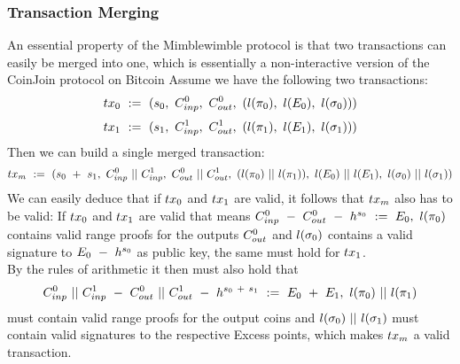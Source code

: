 \subsubsection{Transaction Merging}
An essential property of the Mimblewimble protocol is that two transactions can easily be merged into one, which is essentially a non-interactive version of the CoinJoin protocol on Bitcoin \cite{maxwell2013coinjoin}
Assume we have the following two transactions:
\[ tx_0 ~:=~ (s_0 ,~ C_{inp}^0 ,~ C_{out}^0 ,~ (l(\pi_0) ,~ l(E_0) ,~ l(\sigma_0)) ) \]
\[ tx_1 ~:=~ (s_1 ,~ C_{inp}^1 ,~ C_{out}^1 ,~ (l(\pi_1) ,~ l(E_1) ,~ l(\sigma_1)) ) \]
Then we can build a single merged transaction:
\[ tx_m ~:=~ (s_0 ~+~ s_1 ,~ C_{inp}^0 ~||~ C_{inp}^1,~C_{out}^0 ~||~ C_{out}^1 ,~ (l(\pi_0) ~||~ l(\pi_1)) ,~
l(E_0) ~||~ l(E_1) ,~ l(\sigma_0) ~||~ l(\sigma_1)) \]
We can easily deduce that if $tx_0$ and $tx_1$ are valid, it follows that $tx_m$ also has to be valid:
If $tx_0$ and $tx_1$ are valid that means $C_{inp}^0 ~-~ C_{out}^0 ~-~ h^{s_0} ~:=~ E_0 ,~ l(\pi_0)$ contains valid range proofs for the outputs
$C_{out}^0$ and $l(\sigma_0)$ contains a valid signature to $E_0 ~-~ h^{s_0}$ as public key, the same must hold for $tx_1$. \\
By the rules of arithmetic it then must also hold that
\[ C_{inp}^0 ~||~ C_{inp}^1 ~-~ C_{out}^0 ~||~ C_{out}^1 ~-~ h^{s_0 ~+~ s_1} ~:=~ E_0 ~+~ E_1 ,~ l(\pi_0) ~||~ l(\pi_1) \]
must contain valid range proofs for the output coins and $l(\sigma_0) ~||~ l(\sigma_1)$ must contain valid signatures to the respective Excess points, which makes $tx_m$ a valid transaction.

